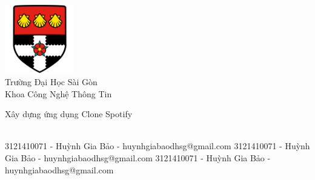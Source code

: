\documentclass[a4paper,11pt,oneside]{book}
\def\groupuninamel{Trường Đại Học Sài Gòn}
\def\groupdepnamel{Công Nghệ Thông Tin}
\begin{document}
    
    \frontmatter
    
    \begin{titlepage}      
        \begin{center}
            \includegraphics[width=3cm]{figures/uorlogo.png}\\[0.5cm]
            {\LARGE \groupuninamel\\[0.5cm]
            Khoa \groupdepnamel}\\[2cm]
			
            \linespread{1.2}\huge {
                Xây dựng ứng dụng Clone Spotify
            
            }
            \linespread{1}~\\[2cm]
            {\Large 
                3121410071 - Huỳnh Gia Bảo - huynhgiabaodhsg@gmail.com
                3121410071 - Huỳnh Gia Bảo - huynhgiabaodhsg@gmail.com
                3121410071 - Huỳnh Gia Bảo - huynhgiabaodhsg@gmail.com
            }\\[1cm] 
            


\end{center}
\end{titlepage}
\end{document}
